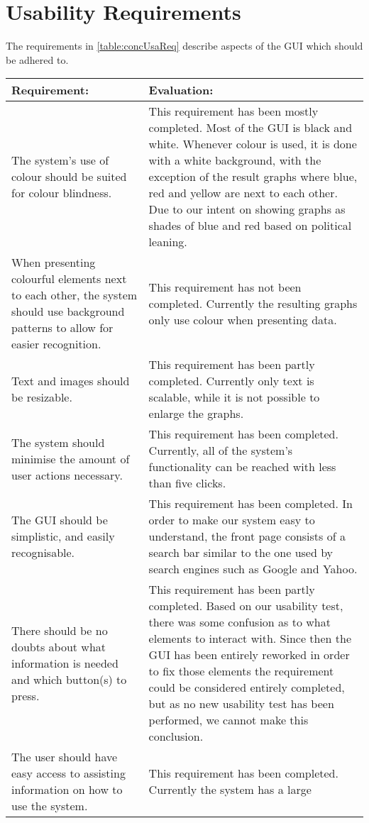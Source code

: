 \section{Usability Requirements}\label{sec:concUsa}
The requirements in \autoref{table:concUsaReq} describe aspects of the
\ac{GUI} which should be adhered to.

\begin{longtable}{|p{6cm}|p{8.5cm}|}\hline
\textbf{Requirement:}	&	\textbf{Evaluation:} \\\hline
The system's use of colour should be suited for colour blindness.
&	This requirement has been mostly completed. Most of the GUI is black and
white. Whenever colour is used, it is done with a white background, with the 
exception of the result graphs where blue, red and yellow are next to each
other.
Due to our intent on showing graphs as shades of blue and red based on political leaning.\\\hline 
When presenting colourful elements next to each other, the system should use
background patterns to allow for easier recognition.
& This requirement has not been completed. Currently the resulting graphs only
use colour when presenting data. \\\hline
Text and images should be resizable.
&	This requirement has been partly completed. Currently only text is scalable,
while it is not possible to enlarge the graphs.\\\hline
The system should minimise the amount of user actions necessary.
&	This requirement has been completed. Currently, all of the system's
functionality can be reached with less than five clicks.\\\hline
The GUI should be simplistic, and easily recognisable.
&	This requirement has been completed. In order to make our system easy to
understand, the front page consists of a search bar similar to the one used by
search engines such as Google and Yahoo.\\\hline
There should be no doubts about what information is
needed and which button(s) to press. 
&	This requirement has been partly completed. Based on our usability test, there
was some confusion as to what elements to interact with. Since then the GUI
has been entirely reworked in order to fix those elements the requirement could
be considered entirely completed, but as no new usability test has been
performed, we cannot make this conclusion.
\\\hline The user should have easy access to assisting information on how to use the
system. 
&	This requirement has been completed. Currently the system has a large

\end{longtable}

